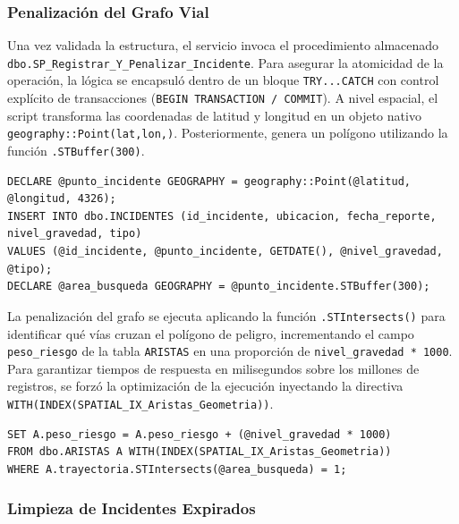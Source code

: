 \subsubsection{Penalización del Grafo Vial}
Una vez validada la estructura, el servicio invoca el procedimiento almacenado \texttt{dbo.SP\allowbreak\_Registrar\allowbreak\_Y\allowbreak\_Penalizar\allowbreak\_Incidente}. Para asegurar la atomicidad de la operación, la lógica se encapsuló dentro de un bloque \texttt{TRY...CATCH} con control explícito de transacciones (\texttt{BEGIN\allowbreak\ TRANSACTION\allowbreak\ /\allowbreak\ COMMIT}). A nivel espacial, el script transforma las coordenadas de latitud y longitud en un objeto nativo \texttt{geography::Point\allowbreak(lat,\allowbreak lon,)}. Posteriormente, genera un polígono utilizando la función \texttt{.STBuffer\allowbreak(300)}.

\begin{lstlisting}
DECLARE @punto_incidente GEOGRAPHY = geography::Point(@latitud, @longitud, 4326);
INSERT INTO dbo.INCIDENTES (id_incidente, ubicacion, fecha_reporte, nivel_gravedad, tipo)
VALUES (@id_incidente, @punto_incidente, GETDATE(), @nivel_gravedad, @tipo);
DECLARE @area_busqueda GEOGRAPHY = @punto_incidente.STBuffer(300);
\end{lstlisting}

La penalización del grafo se ejecuta aplicando la función \texttt{.STIntersects()} para identificar qué vías cruzan el polígono de peligro, incrementando el campo \texttt{peso\_riesgo} de la tabla \texttt{ARISTAS} en una proporción de \texttt{nivel\_gravedad * 1000}. Para garantizar tiempos de respuesta en milisegundos sobre los millones de registros, se forzó la optimización de la ejecución inyectando la directiva \texttt{WITH(INDEX(\allowbreak SPATIAL\_IX\_Aristas\_Geometria))}.
\begin{lstlisting}
SET A.peso_riesgo = A.peso_riesgo + (@nivel_gravedad * 1000)
FROM dbo.ARISTAS A WITH(INDEX(SPATIAL_IX_Aristas_Geometria))
WHERE A.trayectoria.STIntersects(@area_busqueda) = 1;
\end{lstlisting}

\subsubsection{Limpieza de Incidentes Expirados}

